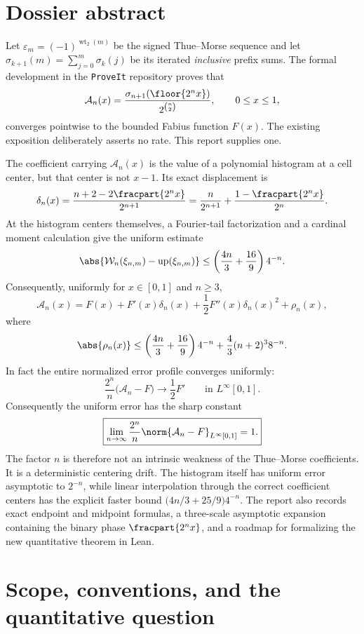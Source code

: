\documentclass[11pt,oneside]{article}
\theoremstyle{definition}
\theoremstyle{remark}
\newcommand{\Up}{\operatorname{up}}
\newcommand{\wt}{\operatorname{wt}_2}
\begin{document}
\section*{Dossier abstract}
Let $\varepsilon_m=(-1)^{\wt(m)}$ be the signed Thue--Morse sequence and let
$\sigma_{k+1}(m)=\sum_{j=0}^{m}\sigma_k(j)$ be its iterated \emph{inclusive}
prefix sums.  The formal development in the \texttt{ProveIt} repository proves
that
\[
 \mathcal A_n(x)=
 \frac{\sigma_{n+1}(\floor{2^n x})}{2^{\binom n2}},
 \qquad 0\le x\le1,
\]
converges pointwise to the bounded Fabius function $F(x)$.  The existing
exposition deliberately asserts no rate.  This report supplies one.

The coefficient carrying $\mathcal A_n(x)$ is the value of a polynomial
histogram at a cell center, but that center is not $x-1$.  Its exact displacement is
\[
 \delta_n(x)=\frac{n+2-2\fracpart{2^n x}}{2^{n+1}}
 =\frac{n}{2^{n+1}}+\frac{1-\fracpart{2^n x}}{2^n}.
\]
At the histogram centers themselves, a Fourier-tail factorization and a cardinal
moment calculation give the uniform estimate
\[
 \abs{\mathcal W_n(\xi_{n,m})-\Up(\xi_{n,m})}
 \le \left(\frac{4n}{3}+\frac{16}{9}\right)4^{-n}.
\]
Consequently, uniformly for $x\in[0,1]$ and $n\ge3$,
\[
 \mathcal A_n(x)=F(x)+F'(x)\delta_n(x)
 +\frac12F''(x)\delta_n(x)^2+\rho_n(x),
\]
where
\[
 \abs{\rho_n(x)}\le
 \left(\frac{4n}{3}+\frac{16}{9}\right)4^{-n}
 +\frac43(n+2)^3 8^{-n}.
\]
In fact the entire normalized error profile converges uniformly:
\[
 \frac{2^n}{n}\bigl(\mathcal A_n-F\bigr)
 \longrightarrow \frac12F'
 \qquad\text{in }L^\infty[0,1].
\]
Consequently the uniform error has the sharp constant
\[
 \boxed{\displaystyle
 \lim_{n\to\infty}\frac{2^n}{n}
 \norm{\mathcal A_n-F}_{L^\infty[0,1]}=1.}
\]
The factor $n$ is therefore not an intrinsic weakness of the Thue--Morse
coefficients.  It is a deterministic centering drift.  The histogram itself has
uniform error asymptotic to $2^{-n}$, while linear interpolation through the
correct coefficient centers has the explicit faster bound $\bigl(4n/3+25/9\bigr)4^{-n}$.
The report also records exact endpoint and midpoint formulas, a three-scale
asymptotic expansion containing the binary phase $\fracpart{2^n x}$, and a roadmap
for formalizing the new quantitative theorem in Lean.


\section{Scope, conventions, and the quantitative question}
\label{tmrate:sec:scope}
\end{document}
